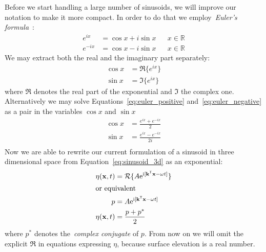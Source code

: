 Before we start handling a large number of sinusoids, we will improve our
notation to make it more compact. In order to do that we employ~\emph{Euler's
formula}~\citep{Euler:1748}:
\begin{align}
\label{eq:euler_positive} e^{ix} &= \cos{x} + i\sin{x} && x \in \mathbb{R} \\
\label{eq:euler_negative} e^{-ix} &= \cos{x} - i\sin{x} && x \in \mathbb{R}
\end{align}
%
We may extract both the real and the imaginary part separately:
\begin{align*}
 \cos{x} &= \Re\{e^{ix}\} \\
 \sin{x} &= \Im\{e^{ix}\}
\end{align*}
where $\Re$ denotes the real part of the exponential and $\Im$ the
complex one. Alternatively we may solve Equations~\ref{eq:euler_positive}
and~\ref{eq:euler_negative} as a pair in the variables $\cos{x}$ and $\sin{x}$
\begin{align*}
 \cos{x} &= \frac{e^{ix}+e^{-ix}}{2}\\
 \sin{x} &= \frac{e^{ix}-e^{-ix}}{2i}\\
\end{align*}
Now we are able to rewrite our current formulation of a sinusoid in three
dimensional space from Equation~\ref{eq:sinusoid_3d} as an exponential:
%
\begin{align}
\label{eq:sinusoid_exponential_sa} \eta(\mathbf{x}, t) &=
\mathcal{R}\{A\mathrm{e}^{\mathrm{i}[\mathbf{k}^{\mathsf{T}}\mathbf{x} -{\omega}t]}\} \\
\intertext{or equivalent}
 p &= A\mathrm{e}^{\mathrm{i}[\mathbf{k}^{\mathsf{T}}\mathbf{x} -
{\omega}t]} \\
 \eta(\mathbf{x}, t) &= \frac{p+p^*}{2}
\end{align}
%
where $p^*$ denotes the~\emph{complex conjugate} of $p$. From now on we will
omit the explicit $\Re$ in equations expressing $\eta$, because surface
elevation is a real number.\\

